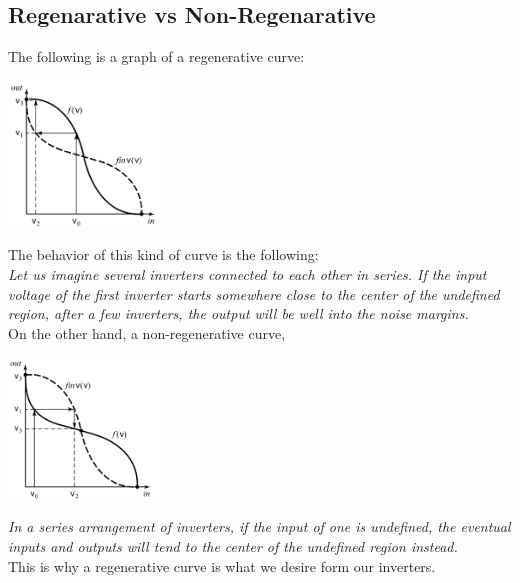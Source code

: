 \documentclass[nobib,fleqn,8pt]{article}
\begin{document}
\subsection{Regenarative vs Non-Regenarative}
The following is a graph of a regenerative curve:
\begin{center}
    \includegraphics*[width = 150px]{images/regenerative_curve.png}
\end{center}
The behavior of this kind of curve is the following:\\
\textit{Let us imagine several inverters connected to each other in series. If the input voltage of the first inverter starts somewhere close to the center of the undefined region, after a few inverters, the output will be well into the noise margins.}\\
On the other hand, a non-regenerative curve,
\begin{center}
    \includegraphics*[width = 150px]{images/non_regenerative_curve.png}
\end{center}
\textit{In a series arrangement of inverters, if the input of one is undefined, the eventual inputs and outputs will tend to the center of the undefined region instead.}\\
This is why a regenerative curve is what we desire form our inverters.\\
\end{document}
